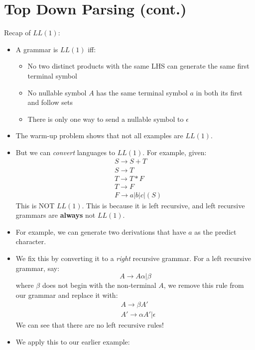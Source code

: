 \documentclass[12pt]{article}
\begin{document}
\section{Top Down Parsing (cont.)}
Recap of $LL(1)$:
\begin{itemize}
    \item A grammar is $LL(1)$ iff:
    \begin{itemize}
        \item No two distinct products with the same LHS can generate the same first terminal symbol
        \item No nullable symbol $A$ has the same terminal symbol $a$ in both its first and follow sets
        \item There is only one way to send a nullable symbol to $\epsilon$
    \end{itemize}
    \item The warm-up problem shows that not all examples are $LL(1)$.  
    \item But we can \emph{convert} languages to $LL(1)$.  For example, given:
        \begin{align}
            &S \rightarrow S + T \\
            &S \rightarrow T \\
            &T \rightarrow T * F \\
            &T \rightarrow F \\
            &F \rightarrow a | b | c | (S)
        \end{align}
        This is NOT $LL(1)$.  This is because it is left recursive, and left recursive grammars are \textbf{always} not $LL(1)$. 
    \item For example, we can generate two derivations that have $a$ as the predict character.
    \item We fix this by converting it to a \emph{right} recursive grammar.  For a left recursive grammar, say:
        $$A \rightarrow A\alpha | \beta$$
        where $\beta$ does not begin with the non-terminal $A$, we remove this rule from our grammar and replace it with:
        \begin{align*}
            &A \rightarrow \beta A' \\
            &A' \rightarrow \alpha A' | \epsilon
        \end{align*}
        We can see that there are no left recursive rules!
    \item We apply this to our earlier example:
        \begin{align*}

\end{align*}
\end{itemize}
\end{document}
